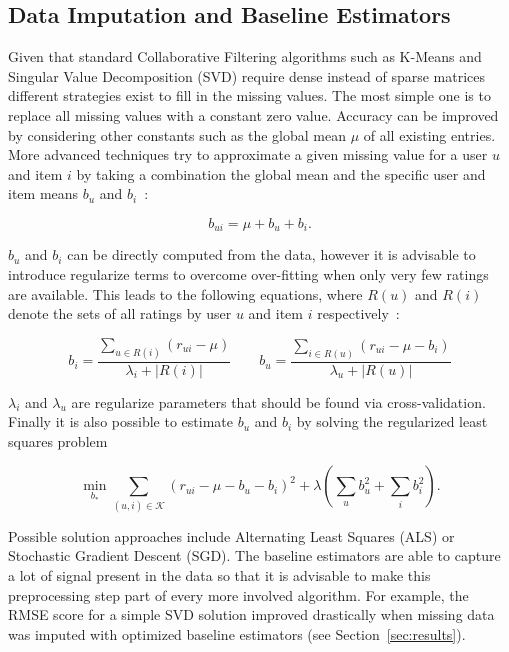 \documentclass[10pt,conference,compsocconf]{IEEEtran}
\newcommand{\abs}[1]{\left\lvert#1\right\rvert}
\begin{document}
\subsection{Data Imputation and Baseline Estimators}
\label{sub:data_imputation_and_baseline_estimators}

Given that standard Collaborative Filtering algorithms such as K-Means and
Singular Value Decomposition (SVD) require dense instead of sparse matrices
different strategies exist to fill in the missing values. The most simple one is
to replace all missing values with a constant zero value. Accuracy can be
improved by considering other constants such as the global mean $\mu$ of all
existing entries.  More advanced techniques try to approximate a given missing
value for a user $u$ and item $i$ by taking a combination the global mean and
the specific user and item means $b_u$ and $b_i$~\cite{koren2008factorization,
  koren2009matrix, koren2010factor, koren2011advances}:

\begin{equation}
  b_{ui} = \mu + b_u + b_i.
\end{equation}

$b_u$ and $b_i$ can be directly computed from the data, however it is advisable
to introduce regularize terms to overcome over-fitting when only very few
ratings are available. This leads to the following equations, where $R(u)$ and
$R(i)$ denote the sets of all ratings by user $u$ and item $i$
respectively~\cite{koren2008factorization, koren2009matrix, koren2010factor,
  koren2011advances}:

\begin{equation}
  b_i = \frac{\sum_{u \in R(i)} (r_{ui} - \mu)}{\lambda_i + \abs{R(i)}}\qquad
  b_u = \frac{\sum_{i \in R(u)} (r_{ui} - \mu - b_i)}{\lambda_u + \abs{R(u)}}
\end{equation}

$\lambda_i$ and $\lambda_u$ are regularize parameters that should be found via
cross-validation. Finally it is also possible to estimate $b_u$ and $b_i$ by
solving the regularized least squares problem~\cite{koren2008factorization,
  koren2009matrix, koren2010factor, koren2011advances}

\begin{equation}
  \min_{b_*} \sum_{(u,i) \in \mathcal K} {(r_{ui} - \mu - b_u - b_i)}^2 +
  \lambda \left( \sum_u b_u^2 + \sum_i b_i^2 \right ).
\end{equation}

Possible solution approaches include Alternating Least Squares (ALS) or
Stochastic Gradient Descent (SGD). The baseline estimators are able to capture a
lot of signal present in the data so that it is advisable to make this
preprocessing step part of every more involved algorithm. For example, the RMSE
score for a simple SVD solution improved drastically when missing data was
imputed with optimized baseline estimators (see Section~\ref{sec:results}).
\end{document}
